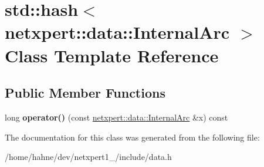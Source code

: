 \hypertarget{classstd_1_1hash_3_01netxpert_1_1data_1_1InternalArc_01_4}{}\section{std\+:\+:hash$<$ netxpert\+:\+:data\+:\+:Internal\+Arc $>$ Class Template Reference}
\label{classstd_1_1hash_3_01netxpert_1_1data_1_1InternalArc_01_4}
\subsection*{Public Member Functions}
\begin{DoxyCompactItemize}
\item 
long {\bfseries operator()} (const \hyperlink{structnetxpert_1_1data_1_1InternalArc}{netxpert\+::data\+::\+Internal\+Arc} \&x) const \hypertarget{classstd_1_1hash_3_01netxpert_1_1data_1_1InternalArc_01_4_a789af0a23bd7d548a7ab16850cb9ad6c}{}\label{classstd_1_1hash_3_01netxpert_1_1data_1_1InternalArc_01_4_a789af0a23bd7d548a7ab16850cb9ad6c}

\end{DoxyCompactItemize}


The documentation for this class was generated from the following file\+:\begin{DoxyCompactItemize}
\item 
/home/hahne/dev/netxpert1\+\_/include/data.\+h\end{DoxyCompactItemize}
